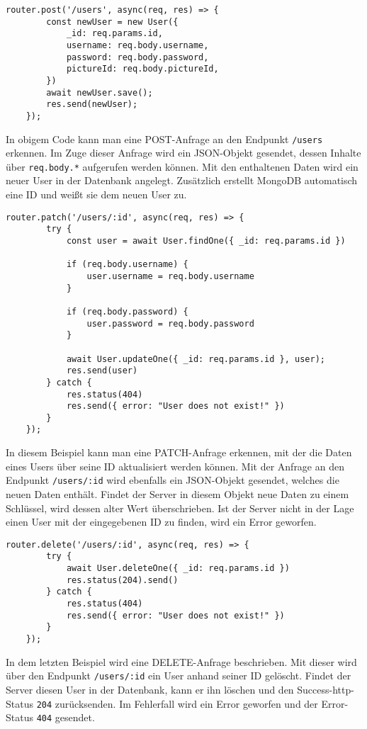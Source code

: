 \begin{lstlisting}[caption=POST-Request, label=lst:postrequest,float=!htb]
    router.post('/users', async(req, res) => {
        const newUser = new User({
            _id: req.params.id,
            username: req.body.username,
            password: req.body.password,
            pictureId: req.body.pictureId,
        })
        await newUser.save();
        res.send(newUser);
    });
\end{lstlisting}

In obigem Code kann man eine POST-Anfrage an den Endpunkt \texttt{/users} erkennen. Im Zuge dieser Anfrage wird ein JSON-Objekt gesendet, dessen Inhalte über \texttt{req.body.*} aufgerufen werden können. Mit den enthaltenen Daten wird ein neuer User in der Datenbank angelegt. Zusätzlich erstellt MongoDB automatisch eine ID und weißt sie dem neuen User zu.

\begin{lstlisting}[caption=PATCH-Request, label=lst:patchrequest,float=!htb]
    router.patch('/users/:id', async(req, res) => {
        try {
            const user = await User.findOne({ _id: req.params.id })

            if (req.body.username) {
                user.username = req.body.username
            }

            if (req.body.password) {
                user.password = req.body.password
            }

            await User.updateOne({ _id: req.params.id }, user);
            res.send(user)
        } catch {
            res.status(404)
            res.send({ error: "User does not exist!" })
        }
    });
\end{lstlisting}

In diesem Beispiel kann man eine PATCH-Anfrage erkennen, mit der die Daten eines Users über seine ID aktualisiert werden können. Mit der Anfrage an den Endpunkt \texttt{/users/:id} wird ebenfalls ein JSON-Objekt gesendet, welches die neuen Daten enthält. Findet der Server in diesem Objekt neue Daten zu einem Schlüssel, wird dessen alter Wert überschrieben. Ist der Server nicht in der Lage einen User mit der eingegebenen ID zu finden, wird ein Error geworfen.

\begin{lstlisting}[caption=DELETE-Request, label=lst:deleterequest,float=!htb]
    router.delete('/users/:id', async(req, res) => {
        try {
            await User.deleteOne({ _id: req.params.id })
            res.status(204).send()
        } catch {
            res.status(404)
            res.send({ error: "User does not exist!" })
        }
    });
\end{lstlisting}

In dem letzten Beispiel wird eine DELETE-Anfrage beschrieben. Mit dieser wird über den Endpunkt \texttt{/users/:id} ein User anhand seiner ID gelöscht. Findet der Server diesen User in der Datenbank, kann er ihn löschen und den Success-http-Status \texttt{204} zurücksenden. Im Fehlerfall wird ein Error geworfen und der Error-Status \texttt{404} gesendet.
